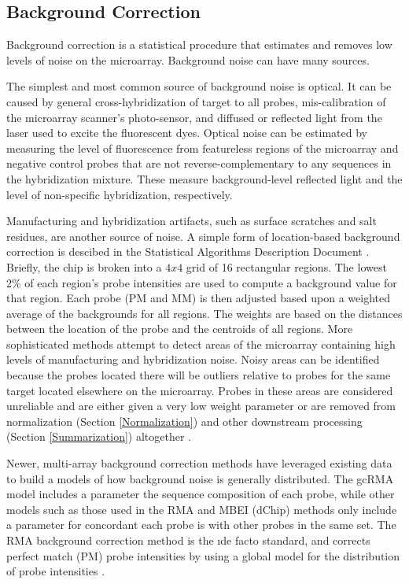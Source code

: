 \subsection{Background Correction}\label{Background Correction}

Background correction is a statistical procedure that estimates and removes low
levels of noise on the microarray.  Background noise can have many sources.

The simplest and most common source of background noise is optical.  It can be
caused by general cross-hybridization of target to all probes, mis-calibration
of the microarray scanner's photo-sensor, and diffused or reflected light from
the laser used to excite the fluorescent dyes.  Optical noise can be estimated
by measuring the level of fluorescence from featureless regions of the
microarray and negative control probes that are not reverse-complementary to
any sequences in the hybridization mixture.  These measure background-level
reflected light and the level of non-specific hybridization, respectively.

Manufacturing and hybridization artifacts, such as surface scratches and salt
residues, are another source of noise.  A simple form of location-based
background correction is descibed in the Statistical Algorithms Description
Document \cite{affy:tech:2002}.   Briefly, the chip is broken into a $4x4$
grid of 16 rectangular regions.  The lowest 2\% of each region's probe
intensities are used to compute a background value for that region.  Each probe
(PM and MM) is then adjusted based upon a weighted average of the backgrounds
for all regions. The weights are based on the distances between the location of
the probe and the centroids of all regions.  More sophisticated methods attempt
to detect areas of the microarray containing high levels of manufacturing and
hybridization noise.  Noisy areas can be identified because the probes located
there will be outliers relative to probes for the same target located elsewhere
on the microarray.  Probes in these areas are considered unreliable and are
either given a very low weight parameter or are removed from normalization
(Section \ref{Normalization}) and other downstream processing (Section
\ref{Summarization}) altogether \cite{affyplm}.

Newer, multi-array background correction methods have leveraged existing data
to build a models of how background noise is generally distributed.  The gcRMA
model \cite{gcrma} includes a parameter the sequence composition of each probe,
while other models such as those used in the RMA and MBEI (dChip)
\cite{rma,mbei,dchip,vsn,bioc} methods only include a parameter for concordant
each probe is with other probes in the same set.  The RMA background correction
method is the \i{de facto} standard, and corrects perfect match (PM) probe
intensities by using a global model for the distribution of probe intensities
\cite{rma,gautier}.

